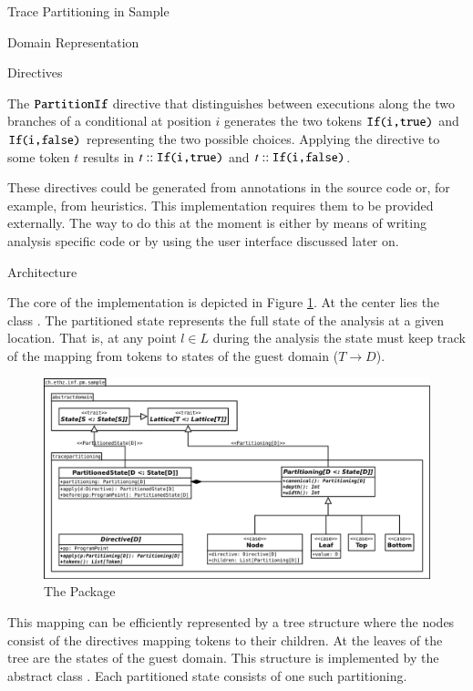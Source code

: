 \begin{chapter}{Trace Partitioning in Sample}
\begin{section}{Domain Representation}
\begin{subsection}{Directives}
			\begin{example}[Directive]
				The $\texttt{PartitionIf}$ directive that distinguishes between executions along the two branches of a conditional at position $i$ generates the two tokens $\texttt{If(i,true)}$ and $\texttt{If(i,false)}$ representing the two possible choices. Applying the directive to some token $t$ results in $t::\texttt{If(i,true)}$ and $t::\texttt{If(i,false)}$.
				\exampleend
			\end{example}

			These directives could be generated from annotations in the source code or, for example, from heuristics. This implementation requires them to be provided externally. The way to do this at the moment is either by means of writing analysis specific code or by using the user interface discussed later on.
		\end{subsection}
	\end{section}


	\begin{section}{Architecture}
		\label{section:PartitionedState}

		The core of the implementation is depicted in Figure \ref{figure:tracepartitioning}. At the center lies the class . The partitioned state represents the full state of the analysis at a given location. That is, at any point $l \in L$ during the analysis the state must keep track of the mapping from tokens to states of the guest domain ($T \to D$).

		\begin{figure}
			\includegraphics[width=\textwidth]{Diagrams/tracepartitioning.png}
			\caption{The  Package}
			\label{figure:tracepartitioning}
		\end{figure}

		This mapping can be efficiently represented by a tree structure where the nodes consist of the directives mapping tokens to their children. At the leaves of the tree are the states of the guest domain. This structure is implemented by the abstract class . Each partitioned state consists of one such partitioning.


\end{section}
\end{chapter}

